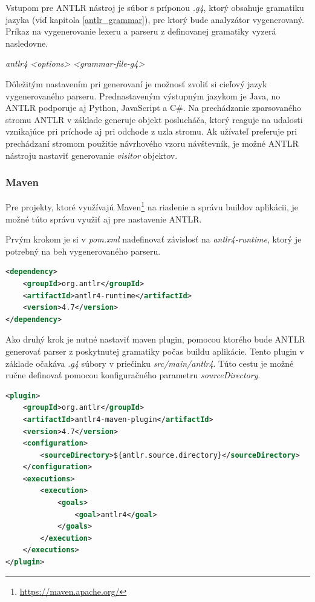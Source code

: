 Vstupom pre ANTLR nástroj je súbor s príponou \textit{.g4}, ktorý obsahuje gramatiku jazyka (viď kapitola \ref{antlr_grammar}), pre ktorý bude analyzátor vygenerovaný. Príkaz na vygenerovanie lexeru a parseru z definovanej gramatiky vyzerá nasledovne.
\begin{center}
\textit{antlr4 <options> <grammar-file-g4>}
\end{center}

Dôležitým nastavením pri generovaní je možnosť zvoliť si cieľový jazyk vygenerovaného parseru. Prednastaveným výstupným jazykom je Java, no ANTLR podporuje aj Python, JavaScript a C\#. Na prechádzanie zparsovaného stromu ANTLR v základe generuje objekt poslucháča, ktorý reaguje na udalosti vznikajúce pri príchode aj pri odchode z uzla stromu. Ak užívateľ preferuje pri prechádzaní stromom použitie návrhového vzoru návštevník, je možné ANTLR nástroju nastaviť generovanie \textit{visitor} objektov.

\subsubsection{Maven}
Pre projekty, ktoré využívajú Maven\footnote{\url{https://maven.apache.org/}} na riadenie a správu buildov aplikácii, je možné túto správu využiť aj pre nastavenie ANTLR.

Prvým krokom je si v \textit{pom.xml} nadefinovať závislosť na \textit{antlr4-runtime}, ktorý je potrebný na beh vygenerovaného parseru.

\begin{lstlisting}[language=XML, frame=none, numbers=none]
<dependency>
    <groupId>org.antlr</groupId>
    <artifactId>antlr4-runtime</artifactId>
    <version>4.7</version>
</dependency>
\end{lstlisting}

Ako druhý krok je nutné nastaviť maven plugin, pomocou ktorého bude ANTLR generovať parser z poskytnutej gramatiky počas buildu aplikácie. Tento plugin v základe očakáva \textit{.g4} súbory v priečinku \textit{src/main/antlr4}. Túto cestu je možné ručne definovať pomocou konfiguračného parametru \textit{sourceDirectory}.

\begin{minipage}{\linewidth}
\begin{lstlisting}[language=XML, frame=none, numbers=none]
<plugin>
    <groupId>org.antlr</groupId>
    <artifactId>antlr4-maven-plugin</artifactId>
    <version>4.7</version>
    <configuration>
        <sourceDirectory>${antlr.source.directory}</sourceDirectory>
    </configuration>
    <executions>
        <execution>
            <goals>
                <goal>antlr4</goal>
            </goals>
        </execution>
    </executions>
</plugin>
\end{lstlisting}
\end{minipage}

